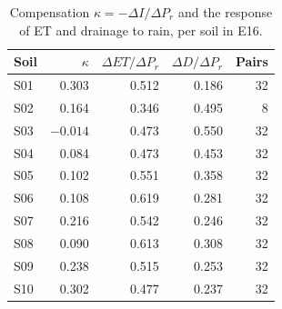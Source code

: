 \begin{table}[H]\centering\small
\caption{Compensation $\kappa=-\Delta I/\Delta P_r$ and the response of ET and drainage to rain, per soil in E16.}
\label{tab:kappa}
\begin{tabular}{lrrrr}
\toprule
Soil & $\kappa$ & $\Delta\mathit{ET}/\Delta P_r$ & $\Delta D/\Delta P_r$ & Pairs\\\midrule
S01 & 0.303 & 0.512 & 0.186 & 32\\
S02 & 0.164 & 0.346 & 0.495 & 8\\
S03 & $-0.014$ & 0.473 & 0.550 & 32\\
S04 & 0.084 & 0.473 & 0.453 & 32\\
S05 & 0.102 & 0.551 & 0.358 & 32\\
S06 & 0.108 & 0.619 & 0.281 & 32\\
S07 & 0.216 & 0.542 & 0.246 & 32\\
S08 & 0.090 & 0.613 & 0.308 & 32\\
S09 & 0.238 & 0.515 & 0.253 & 32\\
S10 & 0.302 & 0.477 & 0.237 & 32\\\bottomrule
\end{tabular}
\end{table}


